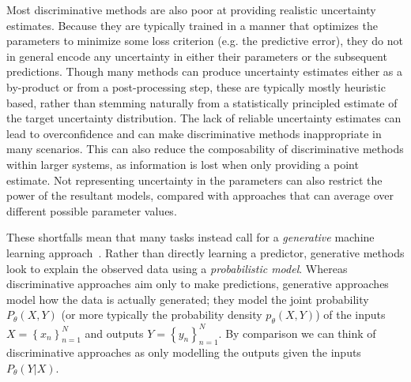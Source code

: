 Most discriminative methods are also poor at providing realistic uncertainty estimates.
Because they are typically trained in a manner that optimizes the parameters to minimize
some loss criterion (e.g. the predictive error), they do not in general encode any uncertainty
in either their parameters or the subsequent predictions.  Though many methods can
produce uncertainty estimates either as a by-product or from a post-processing step,
these are typically mostly heuristic based, rather than stemming naturally from a statistically
principled estimate of the target uncertainty distribution.   The lack of reliable uncertainty
estimates can lead to overconfidence and can make discriminative methods inappropriate in
many scenarios.  This can also reduce the composability of discriminative methods within
larger systems, as information is lost when only providing a point estimate.
Not representing uncertainty in the parameters can also restrict the power of the resultant
models, compared with approaches that can average over different possible parameter values.

These shortfalls mean that many tasks instead call for a \emph{generative} machine learning
approach~\citep{ng2002discriminative,bishop2006pattern}.  Rather than directly learning a 
predictor, generative methods look to explain the observed data using a \emph{probabilistic model}.
Whereas discriminative approaches aim only to make predictions, generative approaches model
how the data is actually generated; they model the joint probability $P_{\theta}(X,Y)$ (or more typically 
the probability density $p_{\theta}(X,Y)$) of the inputs $X = \left\{x_n\right\}_{n=1}^N$ and outputs  
$Y = \left\{y_n\right\}_{n=1}^N$.  By comparison we can think of discriminative approaches as
only modelling the outputs given the inputs $P_{\theta}(Y|X)$.  

